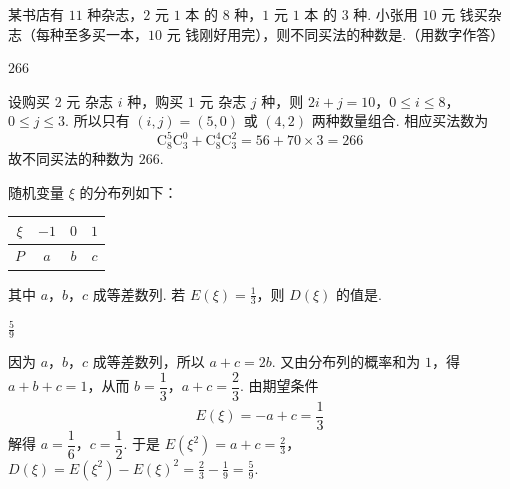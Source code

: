 \begin{problem}
某书店有 \(11\) 种杂志，\(2\text{ 元}\) \(1\text{ 本}\) 的 \(8\) 种，\(1\text{ 元}\) \(1\text{ 本}\) 的 \(3\) 种. 小张用 \(10\text{ 元}\) 钱买杂志（每种至多买一本，\(10\text{ 元}\) 钱刚好用完），则不同买法的种数是\fillinblank{}.（用数字作答）
\begin{answer}
\(266\)
\end{answer}

\begin{solution}
设购买 \(2\text{ 元}\) 杂志 \(i\) 种，购买 \(1\text{ 元}\) 杂志 \(j\) 种，则
\(2i+j=10\)，\(0\leqslant i\leqslant8\)，\(0\leqslant j\leqslant3\).
所以只有 \((i,j)=(5,0)\) 或 \((4,2)\) 两种数量组合. 相应买法数为
\[
\mathrm C_8^5\mathrm C_3^0+\mathrm C_8^4\mathrm C_3^2=56+70\times3=266
\]
故不同买法的种数为 \(266\).
\end{solution}
\end{problem}

\begin{problem}
随机变量 \(\xi\) 的分布列如下：

\begin{center}
\begin{tabular}{c|ccc}
\(\xi\) & \(-1\) & \(0\) & \(1\)\\ \hline
\(P\) & \(a\) & \(b\) & \(c\)
\end{tabular}
\end{center}

其中 \(a\)，\(b\)，\(c\) 成等差数列. 若 \(E(\xi) = \frac{1}{3}\)，则 \(D(\xi)\) 的值是\fillinblank{}.
\begin{answer}
\(\frac{5}{9}\)
\end{answer}

\begin{solution}
因为 \(a\)，\(b\)，\(c\) 成等差数列，所以 \(a+c=2b\). 又由分布列的概率和为 \(1\)，得 \(a+b+c=1\)，从而 \(b=\dfrac13\)，\(a+c=\dfrac23\). 由期望条件
\[
E(\xi)=-a+c=\frac13
\]
解得 \(a=\dfrac16\)，\(c=\dfrac12\). 于是
\(E(\xi^2)=a+c=\frac23\)，\(D(\xi)=E(\xi^2)-E(\xi)^2=\frac23-\frac19=\frac59\).
\end{solution}
\end{problem}

